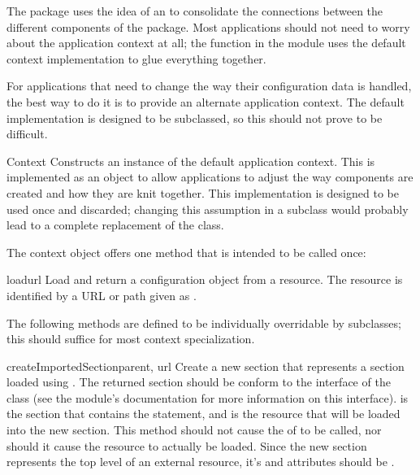 \documentclass{howto}
\begin{document}

The  package uses the idea of an  to consolidate the connections between the different
components of the package.  Most applications should not need to worry
about the application context at all; the  function
in the  module uses the default context implementation
to glue everything together.

For applications that need to change the way their configuration data
is handled, the best way to do it is to provide an alternate
application context.  The default implementation is designed to be
subclassed, so this should not prove to be difficult.

\begin{classdesc}{Context}{}
  Constructs an instance of the default application context.  This is
  implemented as an object to allow applications to adjust the way
  components are created and how they are knit together.  This
  implementation is designed to be used once and discarded; changing
  this assumption in a subclass would probably lead to a complete
  replacement of the class.
\end{classdesc}

The context object offers one method that is intended to be called
once:

\begin{methoddesc}{load}{url}
  Load and return a configuration object from a resource.  The
  resource is identified by a URL or path given as .
\end{methoddesc}

The following methods are defined to be individually overridable by
subclasses; this should suffice for most context specialization.

\begin{methoddesc}{createImportedSection}{parent, url}
  Create a new section that represents a section loaded using
  .  The returned section should be conform to the
  interface of the  class (see the
   module's documentation for more
  information on this interface).   is the section that
  contains the  statement, and  is the
  resource that will be loaded into the new section.  This method
  should not cause the  of  to be
  called, nor should it cause the resource to actually be loaded.
  Since the new section represents the top level of an external
  resource, it's  and  attributes should be
  .
\end{methoddesc}
\end{document}
